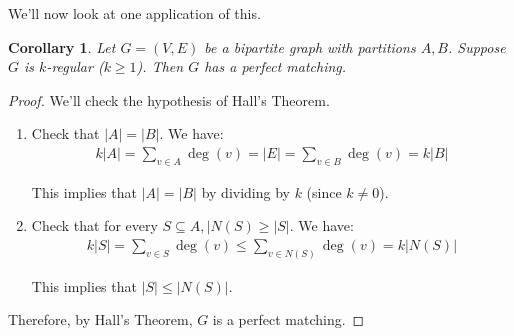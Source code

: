 \documentclass[]{article}
\newtheorem*{corollary}{Corollary}
\theoremstyle{definition}
\begin{document}
			We'll now look at one application of this.
			\begin{corollary}
				Let $G = (V, E)$ be a bipartite graph with partitions $A, B$. Suppose $G$ is $k$-regular ($k \ge 1$). Then $G$ has a perfect matching.
			\end{corollary}

			\begin{proof}
				We'll check the hypothesis of Hall's Theorem.
				\begin{enumerate}
					\item Check that $|A| = |B|$. We have:
						\begin{align*}
							k|A| = \sum_{v \in A} \deg(v) = |E| = \sum_{v \in B} \deg(v) = k|B|
						\end{align*}

						This implies that $|A| = |B|$ by dividing by $k$ (since $k \ne 0$).

					\item Check that for every $S \subseteq A, |N(S) \ge |S|$. We have:
						\begin{align*}
							k|S| = \sum_{v \in S} \deg(v) \le \sum_{v \in N(S)} \deg(v) = k|N(S)|
						\end{align*}

						This implies that $|S| \le |N(S)|$.
				\end{enumerate}

				Therefore, by Hall's Theorem, $G$ is a perfect matching.
			\end{proof}

	\newpage
\end{document}
